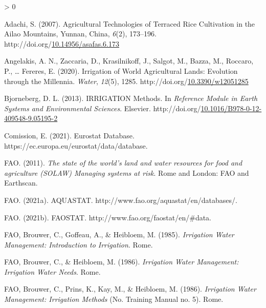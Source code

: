 \documentclass[12pt,twoside]{reedthesis}
\newlength{\cslhangindent}
\newenvironment{CSLReferences}[2] %
 {%
  \setlength{\parindent}{0pt}
  \ifodd #1 \everypar{\setlength{\hangindent}{\cslhangindent}}\ignorespaces\fi
  \ifnum #2 > 0
  \setlength{\parskip}{#2\baselineskip}
  \fi
 }%
 {}
\begin{document}
\hypertarget{refs}{}
\begin{CSLReferences}{1}{0}
\leavevmode\hypertarget{ref-adachiAgriculturalTechnologiesTerraced2007}{}%
Adachi, S. (2007). Agricultural {Technologies} of {Terraced Rice Cultivation} in the {Ailao Mountains}, {Yunnan}, {China}, \emph{6}(2), 173--196. http://doi.org/\href{https://doi.org/10.14956/asafas.6.173}{10.14956/asafas.6.173}

\leavevmode\hypertarget{ref-angelakisIrrigationWorldAgricultural2020}{}%
Angelakis, A. N., Zaccaria, D., Krasilnikoff, J., Salgot, M., Bazza, M., Roccaro, P., \ldots{} Fereres, E. (2020). Irrigation of {World Agricultural Lands}: Evolution through the {Millennia}. \emph{Water}, \emph{12}(5), 1285. http://doi.org/\href{https://doi.org/10.3390/w12051285}{10.3390/w12051285}

\leavevmode\hypertarget{ref-bjornebergIRRIGATIONMethods2013}{}%
Bjorneberg, D. L. (2013). {IRRIGATION} \textbar{} {Methods}. In \emph{Reference {Module} in {Earth Systems} and {Environmental Sciences}}. {Elsevier}. http://doi.org/\href{https://doi.org/10.1016/B978-0-12-409548-9.05195-2}{10.1016/B978-0-12-409548-9.05195-2}

\leavevmode\hypertarget{ref-europeancomissionEurostatDatabase2021}{}%
Comission, E. (2021). Eurostat {Database}. https://ec.europa.eu/eurostat/data/database.

\leavevmode\hypertarget{ref-faoStateWorldLand2011}{}%
FAO. (2011). \emph{The state of the world's land and water resources for food and agriculture ({SOLAW}) {} {Managing} systems at risk}. {Rome and London}: {FAO and Earthscan}.

\leavevmode\hypertarget{ref-faoAQUASTAT2021}{}%
FAO. (2021a). {AQUASTAT}. http://www.fao.org/aquastat/en/databases/.

\leavevmode\hypertarget{ref-faoFAOSTAT2021}{}%
FAO. (2021b). {FAOSTAT}. http://www.fao.org/faostat/en/\#data.

\leavevmode\hypertarget{ref-faoIrrigationWaterManagement1985}{}%
FAO, Brouwer, C., Goffeau, A., \& Heibloem, M. (1985). \emph{Irrigation {Water Management}: Introduction to {Irrigation}}. {Rome}.

\leavevmode\hypertarget{ref-faoIrrigationWaterManagement1986a}{}%
FAO, Brouwer, C., \& Heibloem, M. (1986). \emph{Irrigation {Water Management}: Irrigation {Water Needs}}. {Rome}.

\leavevmode\hypertarget{ref-faoIrrigationWaterManagement1986}{}%
FAO, Brouwer, C., Prins, K., Kay, M., \& Heibloem, M. (1986). \emph{Irrigation {Water Management}: Irrigation {Methods}} (No. Training Manual no. 5). {Rome}.


\end{CSLReferences}
\end{document}

